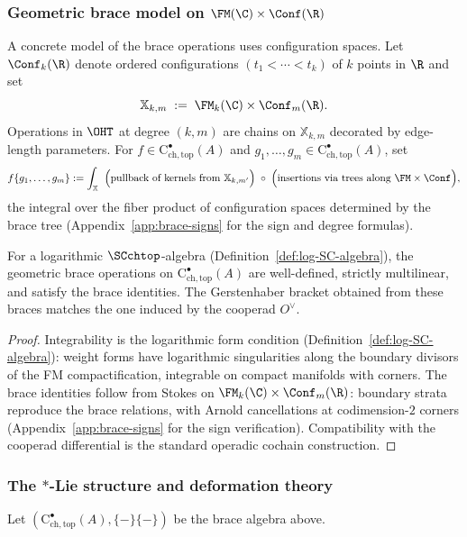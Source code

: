 \subsubsection{\texorpdfstring{Geometric brace model on $\FM(\C)\times\Conf(\R)$}{Geometric brace model on FM(C) x Conf(R)}}
\label{subsec:geometric-brace}
A concrete model of the brace operations uses configuration spaces.
Let $\Conf_k(\R)$ denote ordered configurations $(t_1<\cdots<t_k)$ of $k$ points in $\R$ and set
\[
\mathbb{X}_{k,m} \;:=\; \FM_k(\C)\times \Conf_m(\R).
\]
Operations in $\OHT$ at degree $(k,m)$ are chains on $\mathbb{X}_{k,m}$ decorated by edge-length parameters.
For $f\in \mathrm{C}^\bullet_{\mathrm{ch,top}}(A)$ and $g_1,\dots,g_m\in \mathrm{C}^\bullet_{\mathrm{ch,top}}(A)$, set
\[
f\{g_1,\dots,g_m\} := \int_{\mathbb{X}} \;\;\Bigl(\text{pullback of kernels from } \mathbb{X}_{k,m'} \Bigr)\;\circ\;\Bigl(\text{insertions via trees along } \FM\times \Conf\Bigr),
\]
the integral over the fiber product of configuration spaces determined by the brace tree (Appendix~\ref{app:brace-signs} for the sign and degree formulas).

\begin{proposition}
\label{prop:geometric-braces-well-defined}
For a logarithmic $\SCchtop$-algebra (Definition~\ref{def:log-SC-algebra}), the geometric brace operations on $\mathrm{C}^\bullet_{\mathrm{ch,top}}(A)$ are well-defined, strictly multilinear, and satisfy the brace identities. The Gerstenhaber bracket obtained from these braces matches the one induced by the cooperad $O^\vee$.
\end{proposition}

\begin{proof}
Integrability is the logarithmic form condition (Definition~\ref{def:log-SC-algebra}): weight forms have logarithmic singularities along the boundary divisors of the FM compactification, integrable on compact manifolds with corners. The brace identities follow from Stokes on $\FM_k(\C) \times \Conf_m(\R)$: boundary strata reproduce the brace relations, with Arnold cancellations at codimension-$2$ corners (Appendix~\ref{app:brace-signs} for the sign verification). Compatibility with the cooperad differential is the standard operadic cochain construction.
\end{proof}

\subsubsection{The \texorpdfstring{$\ast$}{*}-Lie structure and deformation theory}
\label{subsec:star-Lie}
Let $(\mathrm{C}^\bullet_{\mathrm{ch,top}}(A),\{-\}\{-\})$ be the brace algebra above.

